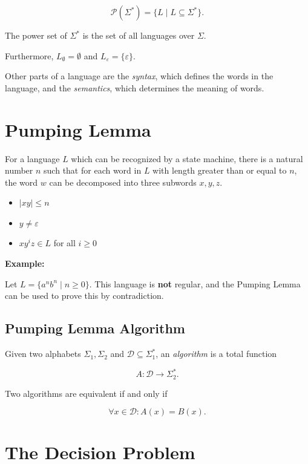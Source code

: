 \[
    \mathcal{P}(\Sigma^{*}) = \{ L \mid L \subseteq \Sigma^{*} \}.
\]

The power set of \(\Sigma^{*}\) is the set of all languages over \(\Sigma\).  

Furthermore, \(L_{\emptyset} = \emptyset\) and \(L_{\varepsilon} = \{\varepsilon\}\).  

Other parts of a language are the \emph{syntax}, which defines the words in the language, and the \emph{semantics}, which determines 
the meaning of words. 

\section{Pumping Lemma}

For a language \(L\) which can be recognized by a state machine, there is a natural number \(n\) such 
that for each word in \(L\) with length greater than or equal to \(n\), the word \(w\) can be decomposed 
into three subwords \(x, y, z\).

\begin{itemize}
    
    \item \(|xy| \leq n\)
    
    \item \(y \neq \varepsilon\)
    
    \item \(xy^i z \in L\) for all \(i \geq 0\)

\end{itemize}

\textbf{Example:}

Let \(L = \{ a^n b^n \mid n \geq 0 \}\). This language is \textbf{not} regular, and the Pumping 
Lemma can be used to prove this by contradiction.

\subsection{Pumping Lemma Algorithm}

Given two alphabets \(\Sigma_1, \Sigma_2\) and \(\mathcal{D} \subseteq \Sigma_{1}^{*}\), an \emph{algorithm} is a total function 

\[
    A: \mathcal{D} \to \Sigma_{2}^{*} .
\]

Two algorithms are equivalent if and only if 

\[
    \forall x \in \mathcal{D} : A(x) = B(x) .
\]

\section{The Decision Problem}

